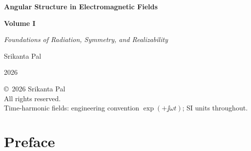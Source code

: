 \frontmatter
\begin{titlepage}
  \centering
  \vspace*{1.5cm}
  {\LARGE\bfseries Angular Structure in Electromagnetic Fields\par}
  \vspace{1.2cm}
  {\Large\bfseries Volume I\par}
  \vspace{0.75cm}
  {\large\itshape Foundations of Radiation, Symmetry, and Realizability\par}
  \vfill
  {\large Srikanta Pal\par}
  \vspace{1.5cm}
  {\normalsize 2026\par}
\end{titlepage}
\cleardoublepage
\thispagestyle{empty}
\vspace*{\fill}
\begin{center}
  \small
  \copyright\ 2026 Srikanta Pal\\[0.5em]
  All rights reserved.\\[1em]
  Time-harmonic fields: engineering convention \(\exp(+\jj\omega t)\); SI units throughout.
\end{center}
\vspace*{\fill}
\cleardoublepage
\tableofcontents
\cleardoublepage
\chapter*{Preface}

\cleardoublepage

\cleardoublepage

\cleardoublepage

\mainmatter
